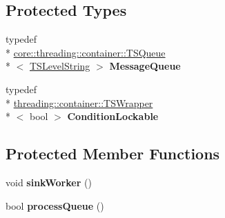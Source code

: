 \subsection*{Protected Types}
\begin{DoxyCompactItemize}
\item 
\hypertarget{classcore_1_1_t_s_queue_sink_ac14c1871c8270403ee5b8dfcab1174f6}{typedef \\*
\hyperlink{classcore_1_1threading_1_1container_1_1_t_s_queue}{core\-::threading\-::container\-::\-T\-S\-Queue}\\*
$<$ \hyperlink{classcore_1_1_timestamped_level_message}{T\-S\-Level\-String} $>$ {\bfseries Message\-Queue}}\label{classcore_1_1_t_s_queue_sink_ac14c1871c8270403ee5b8dfcab1174f6}

\item 
\hypertarget{classcore_1_1_t_s_queue_sink_ac69c5392ea775d4a4ef0d9b9e24fb2ee}{typedef \\*
\hyperlink{classcore_1_1threading_1_1container_1_1_t_s_wrapper}{threading\-::container\-::\-T\-S\-Wrapper}\\*
$<$ bool $>$ {\bfseries Condition\-Lockable}}\label{classcore_1_1_t_s_queue_sink_ac69c5392ea775d4a4ef0d9b9e24fb2ee}

\end{DoxyCompactItemize}
\subsection*{Protected Member Functions}
\begin{DoxyCompactItemize}
\item 
\hypertarget{classcore_1_1_t_s_queue_sink_a3f8c42ed1a341dff38656f0f7b700465}{void {\bfseries sink\-Worker} ()}\label{classcore_1_1_t_s_queue_sink_a3f8c42ed1a341dff38656f0f7b700465}

\item 
\hypertarget{classcore_1_1_t_s_queue_sink_acb0e9be74747c43e2035b9f3b6a6e890}{bool {\bfseries process\-Queue} ()}\label{classcore_1_1_t_s_queue_sink_acb0e9be74747c43e2035b9f3b6a6e890}

\end{DoxyCompactItemize}

